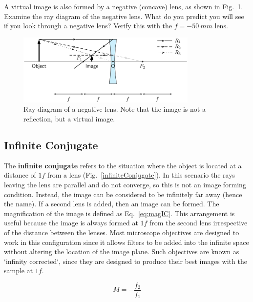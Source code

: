 \documentclass[a4paper]{report}
\begin{document}
A virtual image is also formed by a negative (concave) lens, as shown in Fig.~\ref{fig:neglens}. 
Examine the ray diagram of the negative lens. 
What do you predict you will see if you look through a negative lens?
Verify this with the $f=-50~mm$ lens.
\begin{figure}[h]
\center
\includegraphics[width=3.5in]{negative_lens.eps}
\caption{Ray diagram of a negative lens. Note that the image is not a reflection, but a virtual image. }
\label{fig:neglens}
\end{figure}


\clearpage

\subsection{Infinite Conjugate}
The \textbf{infinite conjugate} refers to the situation where the object is located at a distance of $1f$ from a lens (Fig.~\ref{infiniteConjugate}). 
In this scenario the rays leaving the lens are parallel and do not converge, so this is not an image forming condition. 
Instead, the image can be considered to be infinitely far away (hence the name). 
If a second lens is added, then an image can be formed. 
The magnification of the image is defined as Eq.~\ref{eq:magIC}. 
This arrangement is useful because the image is always formed at $1f$ from the second lens irrespective of the distance between the lenses.
Most microscope objectives are designed to work in this configuration since it allows filters to be added into the infinite space without altering the location of the image plane. 
Such objectives are known as `infinity corrected`, since they are designed to produce their best images with the sample at $1f$.

\begin{equation}
M=-\frac{f_2}{f_1}
\label{eq:magIC}
\end{equation}
\end{document}
